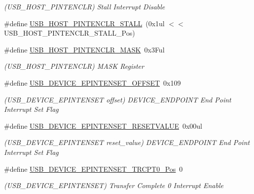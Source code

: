 \begin{DoxyCompactItemize}
\begin{DoxyCompactList}\small\item\em (U\+S\+B\+\_\+\+H\+O\+S\+T\+\_\+\+P\+I\+N\+T\+E\+N\+C\+LR) Stall Interrupt Disable \end{DoxyCompactList}\item 
\#define \mbox{\hyperlink{group___s_a_m_d21___u_s_b_gaa01aa811ced28d68f50c531370de549d}{U\+S\+B\+\_\+\+H\+O\+S\+T\+\_\+\+P\+I\+N\+T\+E\+N\+C\+L\+R\+\_\+\+S\+T\+A\+LL}}~(0x1ul $<$$<$ U\+S\+B\+\_\+\+H\+O\+S\+T\+\_\+\+P\+I\+N\+T\+E\+N\+C\+L\+R\+\_\+\+S\+T\+A\+L\+L\+\_\+\+Pos)
\item 
\#define \mbox{\hyperlink{group___s_a_m_d21___u_s_b_ga3335d306982defff68936f6beb48096f}{U\+S\+B\+\_\+\+H\+O\+S\+T\+\_\+\+P\+I\+N\+T\+E\+N\+C\+L\+R\+\_\+\+M\+A\+SK}}~0x3\+Ful
\begin{DoxyCompactList}\small\item\em (U\+S\+B\+\_\+\+H\+O\+S\+T\+\_\+\+P\+I\+N\+T\+E\+N\+C\+LR) M\+A\+SK Register \end{DoxyCompactList}\item 
\#define \mbox{\hyperlink{group___s_a_m_d21___u_s_b_ga59337d0066849bd4f531ba5efcd153c9}{U\+S\+B\+\_\+\+D\+E\+V\+I\+C\+E\+\_\+\+E\+P\+I\+N\+T\+E\+N\+S\+E\+T\+\_\+\+O\+F\+F\+S\+ET}}~0x109
\begin{DoxyCompactList}\small\item\em (U\+S\+B\+\_\+\+D\+E\+V\+I\+C\+E\+\_\+\+E\+P\+I\+N\+T\+E\+N\+S\+ET offset) D\+E\+V\+I\+C\+E\+\_\+\+E\+N\+D\+P\+O\+I\+NT End Point Interrupt Set Flag \end{DoxyCompactList}\item 
\#define \mbox{\hyperlink{group___s_a_m_d21___u_s_b_ga51ab3a66f621e31c55e0676d4d6484a1}{U\+S\+B\+\_\+\+D\+E\+V\+I\+C\+E\+\_\+\+E\+P\+I\+N\+T\+E\+N\+S\+E\+T\+\_\+\+R\+E\+S\+E\+T\+V\+A\+L\+UE}}~0x00ul
\begin{DoxyCompactList}\small\item\em (U\+S\+B\+\_\+\+D\+E\+V\+I\+C\+E\+\_\+\+E\+P\+I\+N\+T\+E\+N\+S\+ET reset\+\_\+value) D\+E\+V\+I\+C\+E\+\_\+\+E\+N\+D\+P\+O\+I\+NT End Point Interrupt Set Flag \end{DoxyCompactList}\item 
\#define \mbox{\hyperlink{group___s_a_m_d21___u_s_b_gabf4cf455ecc583d83a33aa84c449aa01}{U\+S\+B\+\_\+\+D\+E\+V\+I\+C\+E\+\_\+\+E\+P\+I\+N\+T\+E\+N\+S\+E\+T\+\_\+\+T\+R\+C\+P\+T0\+\_\+\+Pos}}~0
\begin{DoxyCompactList}\small\item\em (U\+S\+B\+\_\+\+D\+E\+V\+I\+C\+E\+\_\+\+E\+P\+I\+N\+T\+E\+N\+S\+ET) Transfer Complete 0 Interrupt Enable \end{DoxyCompactList}\item 
$$
\end{DoxyCompactItemize}
